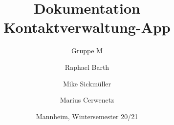 
 \subject{Mobile Anwendungen}   %

\title{Dokumentation\\ Kontaktverwaltung-App}
\subtitle{Gruppe M}
\author{Raphael Barth \and Mike Sickmüller \and Marius Cerwenetz}

\date{Mannheim, Wintersemester 20/21}





